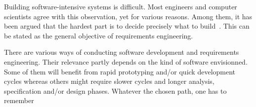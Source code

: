 Building software-intensive systems is difficult. Most engineers and computer scientists agree with this observation, yet for various reasons. Among them, it has been argued that the hardest part is to decide precisely what to build~\cite{Brooks87}. This can be stated as the general objective of requirements engineering.

There are various ways of conducting software development and requirements engineering. Their relevance partly depends on the kind of software envisionned. Some of them will benefit from rapid prototyping and/or quick development cycles whereas others might require slower cycles and longer analysis, specification and/or design phases. Whatever the chosen path, one has to remember 

